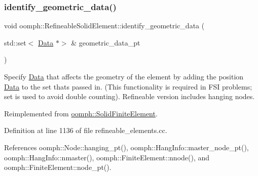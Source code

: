 \mbox{\label{classoomph_1_1RefineableSolidElement_a48623914f87556be55fb97cf68f0ee93}} 
\subsubsection{\texorpdfstring{identify\+\_\+geometric\+\_\+data()}{identify\_geometric\_data()}}
{\footnotesize\ttfamily void oomph\+::\+Refineable\+Solid\+Element\+::identify\+\_\+geometric\+\_\+data (\begin{DoxyParamCaption}\item[{std\+::set$<$ \hyperlink{classoomph_1_1Data}{Data} $\ast$$>$ \&}]{geometric\+\_\+data\+\_\+pt }\end{DoxyParamCaption})\hspace{0.3cm}{\ttfamily [virtual]}}



Specify \hyperlink{classoomph_1_1Data}{Data} that affects the geometry of the element by adding the position \hyperlink{classoomph_1_1Data}{Data} to the set that\textquotesingle{}s passed in. (This functionality is required in F\+SI problems; set is used to avoid double counting). Refineable version includes hanging nodes. 



Reimplemented from \hyperlink{classoomph_1_1SolidFiniteElement_a389e4773864d19ac82337ffc24e4dfa6}{oomph\+::\+Solid\+Finite\+Element}.



Definition at line 1136 of file refineable\+\_\+elements.\+cc.



References oomph\+::\+Node\+::hanging\+\_\+pt(), oomph\+::\+Hang\+Info\+::master\+\_\+node\+\_\+pt(), oomph\+::\+Hang\+Info\+::nmaster(), oomph\+::\+Finite\+Element\+::nnode(), and oomph\+::\+Finite\+Element\+::node\+\_\+pt().

\mbox{\label{classoomph_1_1RefineableSolidElement_a23a8382cc9da7809752851db65e20241}} 
